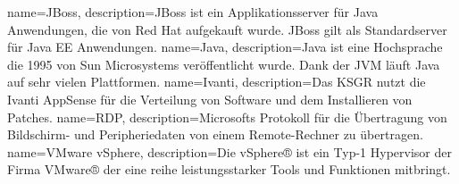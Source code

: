 
\makenoidxglossaries
{}
{
        name=JBoss,
        description={JBoss ist ein Applikationsserver für \Gls{Java} Anwendungen, die von Red Hat aufgekauft wurde.
        JBoss gilt als Standardserver für Java EE Anwendungen\cite{U4ZJDNI2}.}
}
{
        name=Java,
        description={Java ist eine Hochsprache die 1995 von Sun Microsystems veröffentlicht wurde.
Dank der JVM läuft Java auf sehr vielen Plattformen\cite{6H25Z3UI}.}
}
{
        name=Ivanti,
        description={Das KSGR nutzt die Ivanti AppSense\cite{LPHK6T9X, 8CHLH32N} für die Verteilung von Software und dem Installieren von Patches.}
}
{
        name=RDP,
        description={Microsofts Protokoll für die Übertragung von Bildschirm- und Peripheriedaten von einem Remote-Rechner zu übertragen\cite{9PJHPCRS}.}
}
{
        name=VMware vSphere,
        description={Die vSphere® ist ein Typ-1 Hypervisor der Firma VMware® der eine reihe leistungsstarker Tools und Funktionen mitbringt.}
}
